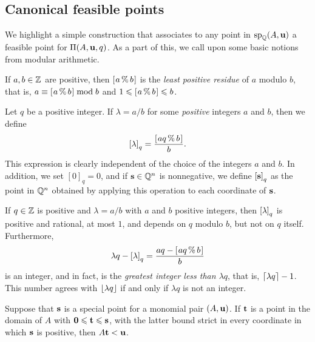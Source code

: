 \documentclass{amsart}
\begin{document}
\subsection{Canonical feasible points}

We highlight a simple construction that associates to any point in $\operatorname{sp}_{\mathbb{Q}}(A, \mathbf{u})$ a feasible point for $\Pi(A, \mathbf{u}, q)$.
As a part of this, we call upon some basic notions from modular arithmetic.

\begin{definition}
   If $a, b \in \mathbb{Z}$ are positive, then $[ \hspace{.01in} a \, \% \, b \hspace{.01in} ]$ is the \emph{least positive residue} of $a$ modulo $b$, that is, $a \equiv [ \hspace{.01in} a \, \% \, b \hspace{.01in} ] \bmod b$ and $1 \leqslant [ \hspace{.01in} a \, \% \, b \hspace{.01in} ] \leqslant b$.
\end{definition}

\begin{definition}
   \label{tail: D}
   Let $q$ be a positive integer.
   If $\lambda = a/b$ for some \emph{positive} integers $a$ and $b$, then we define
   \[ \left[ \lambda \right]_q = \frac{ [ \hspace{.01in} aq \, \% \, b \hspace{.01in} ]}{b}. \]
   This expression is clearly independent of the choice of the integers $a$ and $b$.
   In addition, we set  $[0]_q = 0$, and if $\mathbf{s} \in \mathbb{Q}^n$ is nonnegative, we define $\left[ \mathbf{s} \right]_q$ as the point in $\mathbb{Q}^n$ obtained by applying this operation to each coordinate of $\mathbf{s}$.
\end{definition}

\begin{remark}
   \label{tail-basics: R}
   If $q \in \mathbb{Z}$ is positive and $\lambda = a/b$ with $a$ and $b$ positive integers, then $\left[ \lambda \right]_q$ is positive and rational, at most $1$,  and depends on  $q$ modulo $b$, but not on $q$ itself.
   Furthermore,
   \[ \lambda q - \left[ \lambda \right]_q = \frac{aq-[ \hspace{.01in} aq \, \% \, b \hspace{.01in} ]}{b} \]
   is an integer, and in fact, is the \emph{greatest integer less than $\lambda q$}, that is, $\left\lceil \lambda q \right\rceil - 1$.
   This number agrees with $\left\lfloor  \lambda q \right\rfloor$ if and only if $\lambda q$ is not an integer.
\end{remark}

\begin{lemma}
   \label{less than u: L}
   Suppose that $\mathbf{s}$ is a special point for a monomial pair $(A, \mathbf{u})$.
   If $\mathbf{t}$ is a point in the domain of $A$ with $\mathbf{0} \leqslant \mathbf{t} \leqslant \mathbf{s}$, with the latter bound strict in every coordinate in which $\mathbf{s}$ is positive, then $A \mathbf{t} < \mathbf{u}$.
\end{lemma}
\end{document}
